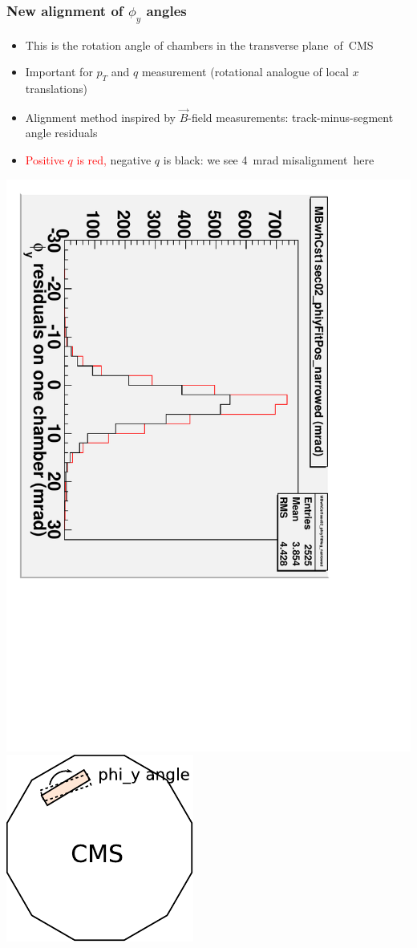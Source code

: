 \documentclass[compress]{beamer}
\begin{document}
\begin{frame}
\frametitle{New alignment of $\phi_y$ angles}

\begin{itemize}
\item This is the rotation angle of chambers in the transverse \mbox{plane of CMS\hspace{-1 cm}}
\item Important for $p_T$ and $q$ measurement (rotational analogue of local $x$ translations)
\item Alignment method inspired by $\vec{B}$-field measurements: track-minus-segment angle residuals
\item \textcolor{red}{Positive $q$ is red,} negative $q$ is black: we see 4~mrad \mbox{misalignment here\hspace{-1 cm}}
\end{itemize}

\includegraphics[height=0.5\linewidth, angle=90]{example_phiy.pdf} \mbox{\hspace{0.5 cm}} \includegraphics[width=0.37\linewidth]{what_phiy_is.pdf}
\end{frame}
\end{document}

